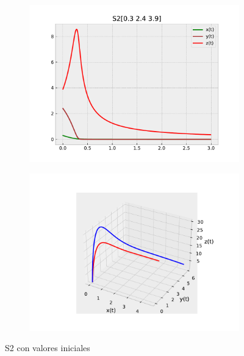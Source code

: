 \documentclass{wscpaperproc}
\theoremstyle{wsc}
\begin{document}
\begin{figure}[h]
	\centering
	\begin{subfigure}[b]{0.5\textwidth}
		\centering
		\includegraphics[width=\textwidth]{Simulations/S2[0.3 2.4 3.9].pdf}
	
		\label{fig:comparativa41}
	\end{subfigure}%
	\begin{subfigure}[b]{0.5\textwidth}
		\centering
		\includegraphics[width=\textwidth]{Simulations/S13d.pdf}
		\label{fig:comparativa42}
	\end{subfigure}
	\caption{S2 con valores iniciales}

	\label{fig:comparacion5}
\end{figure}
\end{document}

